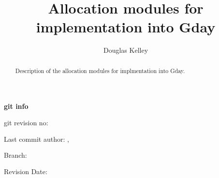 \documentclass[]{report}
\title{Allocation modules for implementation into Gday}
\author{Douglas Kelley}
\begin{document}
\begin{minipage}[h]{\textwidth}
	\maketitle
	\center
	\begin{abstract}
		Description of the allocation modules for implmentation into Gday.
	\end{abstract}
	
	\textbf{git info}
	
	git revision no: \gitAbbrevHash
	
	Last commit author: \gitAuthorName,  \gitAuthorEmail
	
	Branch: \gitReferences
	
	Revision Date: \gitAuthorIsoDate 
\end{minipage}


\tableofcontents


\end{document}
